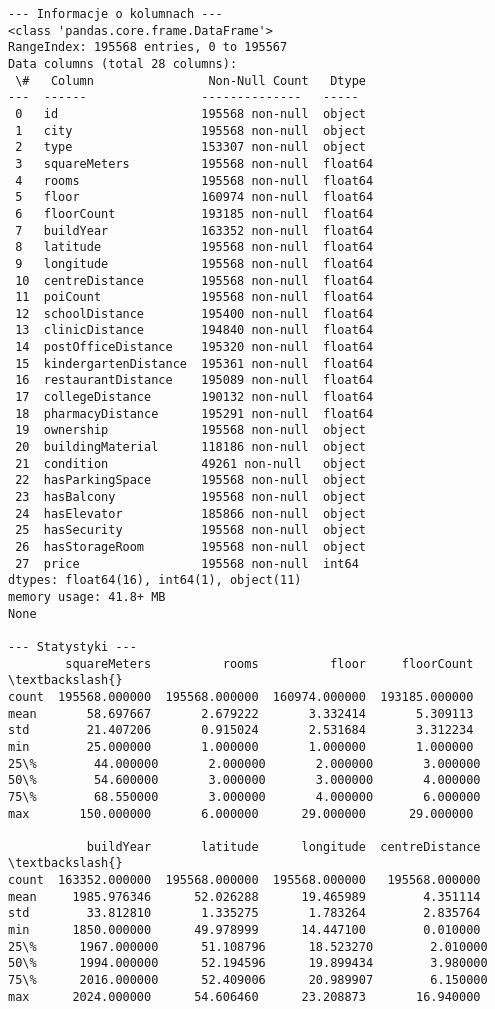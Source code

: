 \documentclass[11pt]{article}
\begin{document}
\begin{Verbatim}[commandchars=\\\{\}]
--- Informacje o kolumnach ---
<class 'pandas.core.frame.DataFrame'>
RangeIndex: 195568 entries, 0 to 195567
Data columns (total 28 columns):
 \#   Column                Non-Null Count   Dtype
---  ------                --------------   -----
 0   id                    195568 non-null  object
 1   city                  195568 non-null  object
 2   type                  153307 non-null  object
 3   squareMeters          195568 non-null  float64
 4   rooms                 195568 non-null  float64
 5   floor                 160974 non-null  float64
 6   floorCount            193185 non-null  float64
 7   buildYear             163352 non-null  float64
 8   latitude              195568 non-null  float64
 9   longitude             195568 non-null  float64
 10  centreDistance        195568 non-null  float64
 11  poiCount              195568 non-null  float64
 12  schoolDistance        195400 non-null  float64
 13  clinicDistance        194840 non-null  float64
 14  postOfficeDistance    195320 non-null  float64
 15  kindergartenDistance  195361 non-null  float64
 16  restaurantDistance    195089 non-null  float64
 17  collegeDistance       190132 non-null  float64
 18  pharmacyDistance      195291 non-null  float64
 19  ownership             195568 non-null  object
 20  buildingMaterial      118186 non-null  object
 21  condition             49261 non-null   object
 22  hasParkingSpace       195568 non-null  object
 23  hasBalcony            195568 non-null  object
 24  hasElevator           185866 non-null  object
 25  hasSecurity           195568 non-null  object
 26  hasStorageRoom        195568 non-null  object
 27  price                 195568 non-null  int64
dtypes: float64(16), int64(1), object(11)
memory usage: 41.8+ MB
None

--- Statystyki ---
        squareMeters          rooms          floor     floorCount  \textbackslash{}
count  195568.000000  195568.000000  160974.000000  193185.000000
mean       58.697667       2.679222       3.332414       5.309113
std        21.407206       0.915024       2.531684       3.312234
min        25.000000       1.000000       1.000000       1.000000
25\%        44.000000       2.000000       2.000000       3.000000
50\%        54.600000       3.000000       3.000000       4.000000
75\%        68.550000       3.000000       4.000000       6.000000
max       150.000000       6.000000      29.000000      29.000000

           buildYear       latitude      longitude  centreDistance  \textbackslash{}
count  163352.000000  195568.000000  195568.000000   195568.000000
mean     1985.976346      52.026288      19.465989        4.351114
std        33.812810       1.335275       1.783264        2.835764
min      1850.000000      49.978999      14.447100        0.010000
25\%      1967.000000      51.108796      18.523270        2.010000
50\%      1994.000000      52.194596      19.899434        3.980000
75\%      2016.000000      52.409006      20.989907        6.150000
max      2024.000000      54.606460      23.208873       16.940000


\end{Verbatim}
\end{document}
